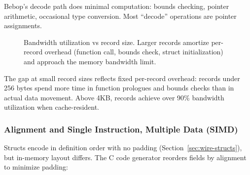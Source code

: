 \documentclass[11pt,onecolumn]{article}
\begin{document}
Bebop's decode path does minimal computation: bounds checking, pointer arithmetic, occasional type conversion. Most ``decode'' operations are pointer assignments.

\begin{figure}[ht]
\centering
{}
\caption{Bandwidth utilization vs record size. Larger records amortize per-record overhead (function call, bounds check, struct initialization) and approach the memory bandwidth limit.}
\label{fig:bandwidth-utilization}
\end{figure}

The gap at small record sizes reflects fixed per-record overhead: records under 256 bytes spend more time in function prologues and bounds checks than in actual data movement. Above 4KB, records achieve over 90\% bandwidth utilization when cache-resident.

\subsubsection{Alignment and Single Instruction, Multiple Data (SIMD)}

Structs encode in definition order with no padding (Section~\ref{sec:wire-structs}), but in-memory layout differs. The C code generator reorders fields by alignment to minimize padding:
\end{document}

